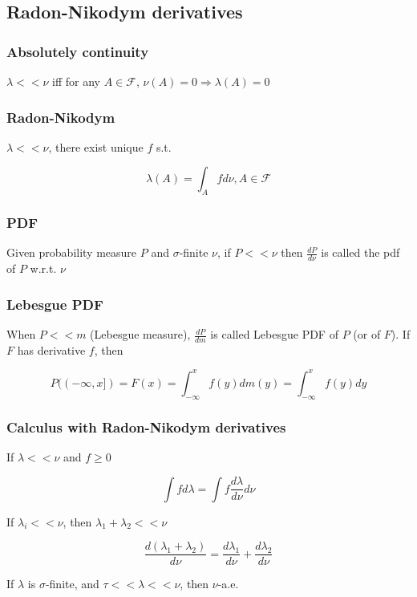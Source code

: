\subsection{Radon-Nikodym derivatives}

\subsubsection{Absolutely continuity}
$\lambda << \nu$ iff for any $A \in \mathcal{F}$, $\nu(A) = 0 \Rightarrow \lambda(A) = 0$

\subsubsection{Radon-Nikodym}

$\lambda << \nu$, there exist unique $f$ s.t.

$$
\lambda(A) = \int_A f d\nu, A\in \mathcal{F}
$$

\subsubsection{PDF}

Given probability measure $P$ and $\sigma$-finite $\nu$, if $P << \nu$ then $\frac{dP}{d\nu}$ is called the pdf of $P$ w.r.t. $\nu$

\subsubsection{Lebesgue PDF}

When $P << m$ (Lebesgue measure), $\frac{dP}{dm}$ is called Lebesgue PDF of $P$ (or of $F$). If $F$ has derivative $f$, then

$$
P((-\infty, x]) = F(x) = \int_{-\infty}^x f(y) dm(y) = \int_{-\infty}^x f(y) dy
$$

\subsubsection{Calculus with Radon-Nikodym derivatives}
If $\lambda << \nu$ and $f \geq 0$

$$
\int f d\lambda = \int f \frac{d\lambda}{d\nu} d\nu
$$

If $\lambda_i << \nu$, then $\lambda_1 + \lambda_2 << \nu$

$$
\frac{d(\lambda_1 + \lambda_2)}{d\nu} = \frac{d\lambda_1}{d\nu} + \frac{d\lambda_2}{d\nu}
$$

If $\lambda$ is $\sigma$-finite, and $\tau << \lambda << \nu$, then $\nu$-a.e.


